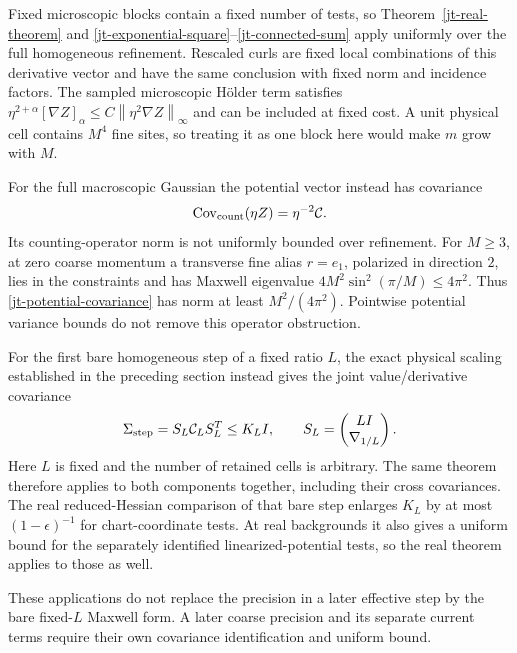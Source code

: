 \documentclass[11pt]{article}
\theoremstyle{remark}
\newcommand{\norm}[1]{\left\|#1\right\|}
\begin{document}
Fixed microscopic blocks contain a fixed number of tests, so
Theorem~\ref{jt-real-theorem} and
\eqref{jt-exponential-square}--\eqref{jt-connected-sum} apply
uniformly over the full homogeneous refinement. Rescaled curls
are fixed local combinations of this derivative vector and
have the same conclusion with fixed norm and incidence factors.
The sampled microscopic H\"older term satisfies
$\eta^{2+\alpha}[\nabla Z]_\alpha
\le C\norm{\eta^2\nabla Z}_\infty$ and can be included at
fixed cost. A unit physical cell contains $M^4$ fine sites,
so treating it as one block here would make $m$ grow with $M$.

For the full macroscopic Gaussian the potential vector instead
has covariance
\begin{equation}\label{jt-potential-covariance}
 \operatorname{Cov}_{\rm count}(\eta Z)=\eta^{-2}\mathcal C.
\end{equation}
Its counting-operator norm is not uniformly bounded over
refinement. For $M\ge3$, at zero coarse momentum a transverse fine alias
$r=e_1$, polarized in direction $2$, lies in the constraints
and has Maxwell eigenvalue $4M^2\sin^2(\pi/M)\le4\pi^2$.
Thus \eqref{jt-potential-covariance} has norm at least
$M^2/(4\pi^2)$. Pointwise potential variance bounds do not
remove this operator obstruction.

For the first bare homogeneous step of a fixed ratio $L$, the
exact physical scaling established in the preceding section
instead gives the joint value/derivative covariance
\begin{equation}\label{jt-fixed-step-covariance}
 \Sigma_{\rm step}=S_L\mathcal C_LS_L^T\le K_LI,
 \qquad S_L=\begin{pmatrix}LI\\\nabla_{1/L}\end{pmatrix}.
\end{equation}
Here $L$ is fixed and the number of retained cells is arbitrary.
The same theorem therefore applies to both components together,
including their cross covariances. The real reduced-Hessian
comparison of that bare step enlarges $K_L$ by at most
$(1-\epsilon)^{-1}$ for chart-coordinate tests. At real
backgrounds it also gives a uniform bound for the separately
identified linearized-potential tests, so the real theorem
applies to those as well.

These applications do not replace the precision in a later
effective step by the bare fixed-$L$ Maxwell form. A later
coarse precision and its separate current terms require their
own covariance identification and uniform bound.
\end{document}
